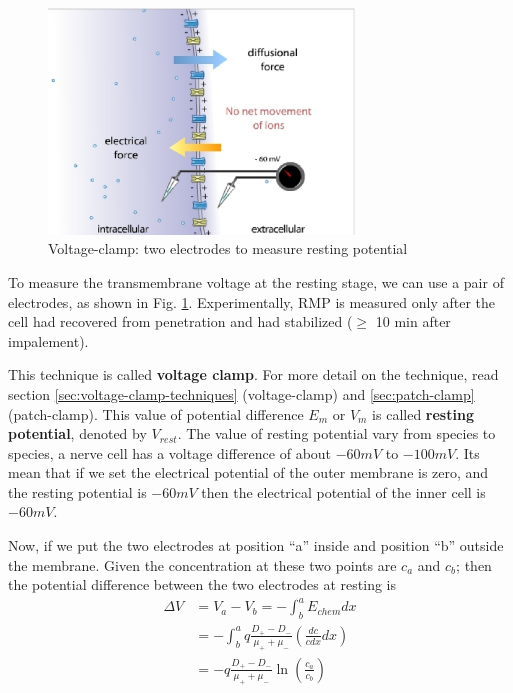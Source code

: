 \begin{figure}[htb]
  \centerline{\includegraphics[height=6cm]{./images/electric-potential.eps}}
  \caption{Voltage-clamp: two electrodes to measure resting
    potential}\label{fig:measure-Vrest}
\end{figure}

To measure the transmembrane voltage at the resting stage, we can use
a pair of electrodes, as shown in Fig. \ref{fig:measure-Vrest}. 
Experimentally, RMP is measured only after the cell had recovered from
penetration and had stabilized ($\ge$ 10 min after impalement).

This technique is called {\bf voltage clamp}. For more detail on the
technique, read section \ref{sec:voltage-clamp-techniques} (voltage-clamp) and
\ref{sec:patch-clamp} (patch-clamp). This value of potential
difference $E_m$ or $V_m$ is called {\bf resting potential}, denoted
by $V_{rest}$.  The value of resting potential vary from species to
species, a nerve cell has a voltage difference of about $-60 mV$ to
$-100 mV$. Its mean that if we set the electrical potential of the
outer membrane is zero, and the resting potential is $-60 mV$ then the
electrical potential of the inner cell is $-60mV$. 



Now, if we put the two electrodes at position ``a'' inside and position ``b''
outside the membrane. Given the concentration at these two points are $c_a$
and $c_b$; then the potential difference between the two electrodes at
resting is
\begin{equation}\label{eq:diff_potent}
  \begin{split}
    \Delta V &= V_a - V_b = - \int_b^a E_{chem}dx  \\
    &=- \int_b^a q\frac{D_+ -
      D_-}{\mu_+ + \mu_-}  \left( \frac{dc}{cdx}dx \right) \\
    &= -q\frac{D_+ - D_-}{\mu_+ + \mu_-} \ln \left( \frac{c_a}{c_b}
    \right)
  \end{split}
\end{equation}

